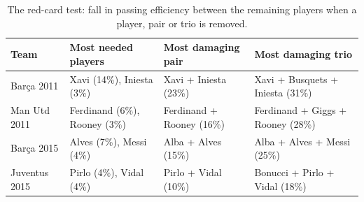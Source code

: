 \begin{table}[t]
\centering\small
\caption{The red-card test: fall in passing efficiency between the remaining players when a player, pair or trio is removed.}
\label{tab:redcard}
\begin{tabularx}{\textwidth}{lXXX}
\toprule
Team & Most needed players & Most damaging pair & Most damaging trio \\
\midrule
Barça 2011 & Xavi (14\%), Iniesta (3\%) & Xavi + Iniesta (23\%) & Xavi + Busquets + Iniesta (31\%) \\
Man Utd 2011 & Ferdinand (6\%), Rooney (3\%) & Ferdinand + Rooney (16\%) & Ferdinand + Giggs + Rooney (28\%) \\
Barça 2015 & Alves (7\%), Messi (4\%) & Alba + Alves (15\%) & Alba + Alves + Messi (25\%) \\
Juventus 2015 & Pirlo (4\%), Vidal (4\%) & Pirlo + Vidal (10\%) & Bonucci + Pirlo + Vidal (18\%) \\
\bottomrule
\end{tabularx}
\end{table}
